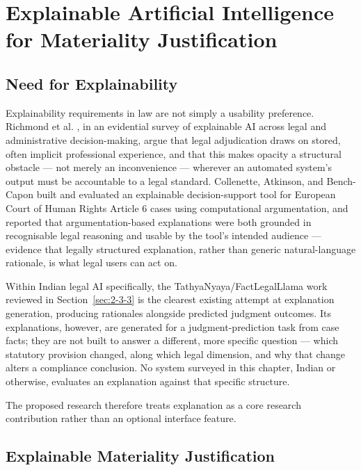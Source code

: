 \section{Explainable Artificial Intelligence for Materiality Justification}

\label{sec:2-8}

\subsection{Need for Explainability}

\label{sec:2-8-1}

Explainability requirements in law are not simply a usability preference. Richmond et al. \cite{richmond2024xaisurvey}, in an evidential survey of explainable AI across legal and administrative decision-making, argue that legal adjudication draws on stored, often implicit professional experience, and that this makes opacity a structural obstacle — not merely an inconvenience — wherever an automated system's output must be accountable to a legal standard. Collenette, Atkinson, and Bench-Capon \cite{collenette2023ecthr} built and evaluated an explainable decision-support tool for European Court of Human Rights Article 6 cases using computational argumentation, and reported that argumentation-based explanations were both grounded in recognisable legal reasoning and usable by the tool's intended audience — evidence that legally structured explanation, rather than generic natural-language rationale, is what legal users can act on.

Within Indian legal AI specifically, the TathyaNyaya/FactLegalLlama work reviewed in Section~\ref{sec:2-3-3} \cite{nigam2025tathyanyaya} is the clearest existing attempt at explanation generation, producing rationales alongside predicted judgment outcomes. Its explanations, however, are generated for a judgment-prediction task from case facts; they are not built to answer a different, more specific question — which statutory provision changed, along which legal dimension, and why that change alters a compliance conclusion. No system surveyed in this chapter, Indian or otherwise, evaluates an explanation against that specific structure.

The proposed research therefore treats explanation as a core research contribution rather than an optional interface feature.

\subsection{Explainable Materiality Justification}

